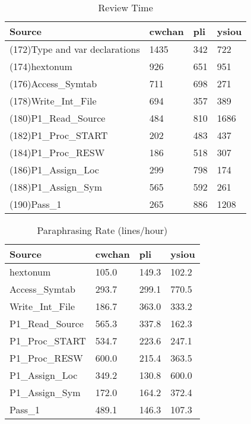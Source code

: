 \begin{table}[hb]
\begin{center}
\begin{tabular}{|l|l|l|l|}
\hline
Source & cwchan & pli & ysiou\\
\hline
(172)Type and var declarations & 1435 & 342 & 722\\
(174)hextonum & 926 & 651 & 951\\
(176)Access\_Symtab & 711 & 698 & 271\\
(178)Write\_Int\_File & 694 & 357 & 389\\
(180)P1\_Read\_Source & 484 & 810 & 1686\\
(182)P1\_Proc\_START & 202 & 483 & 437\\
(184)P1\_Proc\_RESW & 186 & 518 & 307\\
(186)P1\_Assign\_Loc & 299 & 798 & 174\\
(188)P1\_Assign\_Sym & 565 & 592 & 261\\
(190)Pass\_1 & 265 & 886 & 1208\\
\hline
\end{tabular}
\end{center}
\caption{Review Time}
\end{table}

\begin{table}[hb]
\begin{center}
\begin{tabular}{|l|l|l|l|}
\hline
Source & cwchan & pli & ysiou\\
\hline
hextonum & 105.0 & 149.3 & 102.2\\
Access\_Symtab & 293.7 & 299.1 & 770.5\\
Write\_Int\_File & 186.7 & 363.0 & 333.2\\
P1\_Read\_Source & 565.3 & 337.8 & 162.3\\
P1\_Proc\_START & 534.7 & 223.6 & 247.1\\
P1\_Proc\_RESW & 600.0 & 215.4 & 363.5\\
P1\_Assign\_Loc & 349.2 & 130.8 & 600.0\\
P1\_Assign\_Sym & 172.0 & 164.2 & 372.4\\
Pass\_1 & 489.1 & 146.3 & 107.3\\
\hline
\end{tabular}
\end{center}
\caption{Paraphrasing Rate (lines/hour)}
\end{table}


